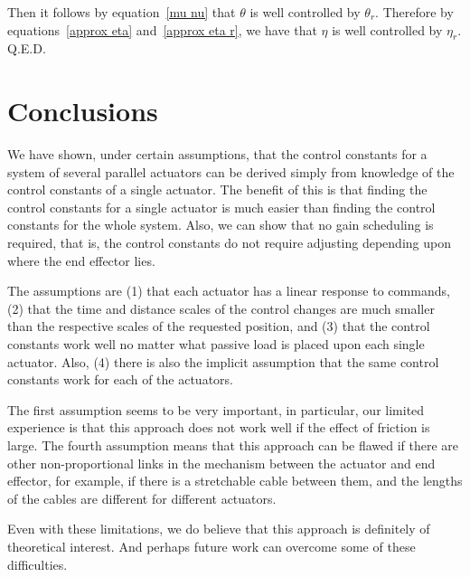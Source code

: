 \documentclass[reqno,twocolumn]{amsart}
\begin{document}
Then it follows by equation~\eqref{mu nu} that $\theta$ is well controlled by $\theta_r$.  Therefore by equations~\eqref{approx eta} and~\eqref{approx eta r}, we have that $\eta$ is well controlled by $\eta_r$.
\hfill Q.E.D.

\section{Conclusions}

We have shown, under certain assumptions, that the control constants for a system of several parallel actuators can be derived simply from knowledge of the control constants of a single actuator.  The benefit of this is that finding the control constants for a single actuator is much easier than finding the control constants for the whole system.  Also, we can show that no gain scheduling is required, that is, the control constants do not require adjusting depending upon where the end effector lies.

The assumptions are (1) that each actuator has a linear response to commands, (2) that the time and distance scales of the control changes are much smaller than the respective scales of the requested position, and (3) that the control constants work well no matter what passive load is placed upon each single actuator.  Also, (4) there is also the implicit assumption that the same control constants work for each of the actuators.

The first assumption seems to be very important, in particular, our limited experience is that this approach does not work well if the effect of friction is large.  The fourth assumption means that this approach can be flawed if there are other non-proportional links in the mechanism between the actuator and end effector, for example, if there is a stretchable cable between them, and the lengths of the cables are different for different actuators.

Even with these limitations, we do believe that this approach is definitely of theoretical interest.  And perhaps future work can overcome some of these difficulties.
\end{document}
